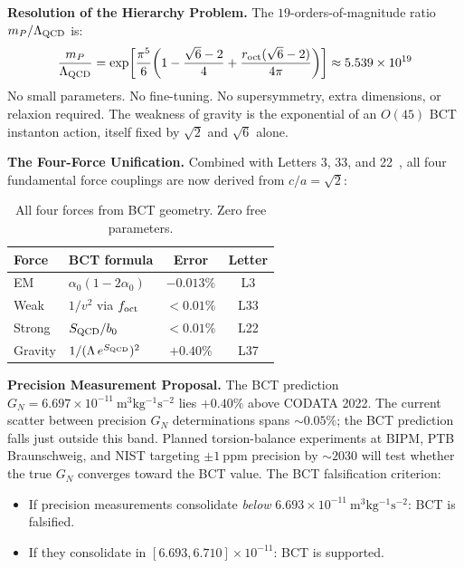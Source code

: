 \documentclass[aps,prl,twocolumn,superscriptaddress,floatfix]{revtex4-2}
\begin{document}
\medskip
\noindent\textbf{Resolution of the Hierarchy Problem.}
The $19$-orders-of-magnitude ratio $m_P/\Lambda_{\rm QCD}$ is:
\begin{equation}
  \frac{m_P}{\Lambda_{\rm QCD}} = \exp\!\left[\frac{\pi^5}{6}
    \!\left(1 - \frac{\sqrt{6}-2}{4} + \frac{r_{\rm oct}(\sqrt{6}-2)}{4\pi}\right)\right]
  \approx 5.539\times10^{19}
  \label{eq:hierarchy}
\end{equation}
No small parameters. No fine-tuning. No supersymmetry, extra dimensions,
or relaxion required. The weakness of gravity is the exponential of
an $O(45)$ BCT instanton action, itself fixed by $\sqrt{2}$ and $\sqrt{6}$ alone.

\medskip
\noindent\textbf{The Four-Force Unification.}
Combined with Letters 3, 33, and 22~\cite{L3,L33,L22}, all four fundamental
force couplings are now derived from $c/a = \sqrt{2}$:
\begin{table}[h]
\centering
\caption{All four forces from BCT geometry. Zero free parameters.}
\label{tab:4forces}
\begin{tabular}{llcc}
\toprule
Force & BCT formula & Error & Letter \\
\midrule
EM & $\alpha_0(1-2\alpha_0)$ & $-0.013\%$ & L3 \\
Weak & $1/v^2$ via $f_{\rm oct}$ & ${<}0.01\%$ & L33 \\
Strong & $S_{\rm QCD}/b_0$ & ${<}0.01\%$ & L22 \\
Gravity & $1/(\Lambda\,e^{S_{\rm QCD}})^2$ & $+0.40\%$ & L37 \\
\bottomrule
\end{tabular}
\end{table}

\medskip
\noindent\textbf{Precision Measurement Proposal.}
The BCT prediction $G_N = 6.697\times10^{-11}\ \mathrm{m^3kg^{-1}s^{-2}}$
lies $+0.40\%$ above CODATA 2022. The current scatter between precision
$G_N$ determinations spans $\sim 0.05\%$; the BCT prediction falls
just outside this band. Planned torsion-balance experiments at BIPM,
PTB Braunschweig, and NIST targeting $\pm 1\ \mathrm{ppm}$ precision
by $\sim 2030$ will test whether the true $G_N$ converges toward the
BCT value. The BCT falsification criterion:
\begin{itemize}
  \item If precision measurements consolidate \emph{below}
    $6.693\times10^{-11}\ \mathrm{m^3kg^{-1}s^{-2}}$: BCT is falsified.
  \item If they consolidate in $[6.693, 6.710]\times10^{-11}$: BCT is supported.
\end{itemize}
\end{document}

